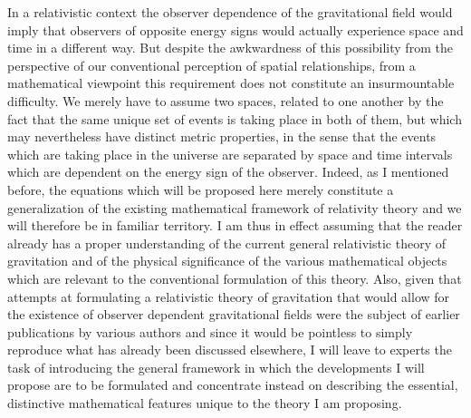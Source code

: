 \documentclass[notitlepage,12pt]{report}
\begin{document}
In a relativistic context the observer dependence of the gravitational field would imply that observers of opposite energy signs would actually experience space and time in a different way. But despite the awkwardness of this possibility from the perspective of our conventional perception of spatial relationships, from a mathematical viewpoint this requirement does not constitute an insurmountable difficulty. We merely have to assume two spaces, related to one another by the fact that the same unique set of events is taking place in both of them, but which may nevertheless have distinct metric properties, in the sense that the events which are taking place in the universe are separated by space and time intervals which are dependent on the energy sign of the observer. Indeed, as I mentioned before, the equations which will be proposed here merely constitute a generalization of the existing mathematical framework of relativity theory and we will therefore be in familiar territory. I am thus in effect assuming that the reader already has a proper understanding of the current general relativistic theory of gravitation and of the physical significance of the various mathematical objects which are relevant to the conventional formulation of this theory. Also, given that attempts at formulating a relativistic theory of gravitation that would allow for the existence of observer dependent gravitational fields were the subject of earlier publications by various authors and since it would be pointless to simply reproduce what has already been discussed elsewhere, I will leave to experts the task of introducing the general framework in which the developments I will propose are to be formulated and concentrate instead on describing the essential, distinctive mathematical features unique to the theory I am proposing.
\end{document}
